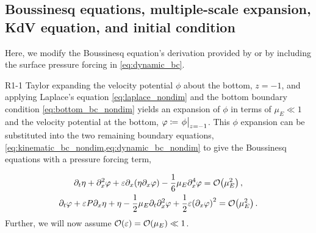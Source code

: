 \documentclass{jfm}
\renewcommand*{\epsilon}{\varepsilon}
\begin{document}
\subsection{\label{sec:boussinesq} Boussinesq equations, multiple-scale
expansion, KdV equation, and initial condition}
Here, we modify the Boussinesq equation's derivation provided by
\citet{mei2005nonlinear} or \citet{ablowitz2011nonlinear} by including
the surface pressure forcing in \cref{eq:dynamic_bc}.
\begin{LineLabel}{R1-1}
Taylor expanding the velocity potential $\phi$ about the bottom,
$z=-1$, and applying Laplace's
equation \cref{eq:laplace_nondim} and the bottom boundary
condition \cref{eq:bottom_bc_nondim} yields an expansion of $\phi$ in
terms of $\mu_E \ll 1$ and the velocity potential at the bottom,
$\varphi \coloneqq \eval{\phi}_{z=-1}$.
This $\phi$ expansion can be substituted into the two remaining boundary
equations, \cref{eq:kinematic_bc_nondim,eq:dynamic_bc_nondim} to give
the Boussinesq equations with a pressure forcing term,
\end{LineLabel}
\begin{gather}
  \partial_t \eta + \partial_x^2 \varphi + \epsilon \partial_x
    \pqty{\eta \partial_x \varphi} -\frac{1}{6}\mu_E \partial^4_x
    \varphi = \order{\mu_E^2} \label{eq:kinematic_bc_varphi} \,, \\
  \partial_t \varphi + \epsilon P \partial_x \eta + \eta -
    \frac{1}{2}\mu_E \partial_t \partial_x^2 \varphi +
    \frac{1}{2}\epsilon\pqty{\partial_x \varphi}^2 = \order{\mu_E^2} \,.
    \label{eq:dynamic_bc_varphi}
\end{gather}
Further, we will now assume $\order{\epsilon} = \order{\mu_E} \ll 1$.
\end{document}
